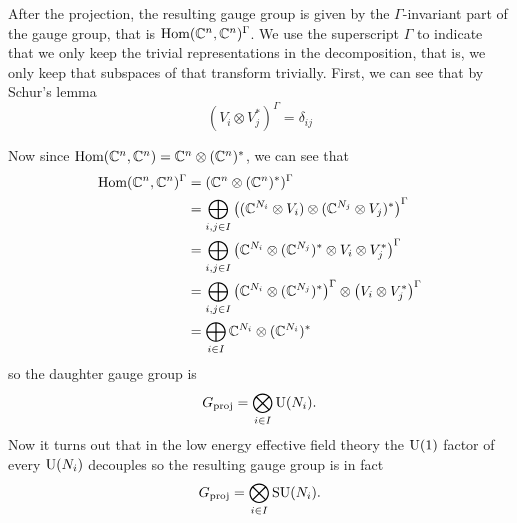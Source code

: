 \documentclass[a4paper,11pt]{article}
\begin{document}
        After the projection, the resulting gauge group is given by the $\Gamma$-invariant part of the gauge group, that is $\text{Hom}(\mathbb{C}^n,\mathbb{C}^n)^\Gamma$. We use the superscript $\Gamma$ to indicate that we only keep the trivial representations in the decomposition, that is, we only keep that subspaces of that transform trivially. First, we can see that by Schur's lemma \marker
        \begin{equation}
            (V_i\otimes V^*_j)^\Gamma=\delta_{ij}
        \end{equation}
        
        Now since $\text{Hom}(\mathbb{C}^n,\mathbb{C}^n)=\mathbb{C}^n\otimes(\mathbb{C}^n)^*$, we can see that
        \begin{align}
            \text{Hom}(\mathbb{C}^n,\mathbb{C}^n)^\Gamma &= (\mathbb{C}^n\otimes(\mathbb{C}^n)^*)^\Gamma\\
            &= \bigoplus_{i,j\in I} \left((\mathbb{C}^{N_i}\otimes V_i)\otimes(\mathbb{C}^{N_j}\otimes V_j)^*\right)^\Gamma\\
            &= \bigoplus_{i,j\in I} \left(\mathbb{C}^{N_i}\otimes(\mathbb{C}^{N_j})^*\otimes V_i\otimes V^*_j\right)^\Gamma\\
            &= \bigoplus_{i,j\in I} \left(\mathbb{C}^{N_i}\otimes(\mathbb{C}^{N_j})^*\right)^\Gamma\otimes\left(V_i\otimes V^*_j\right)^\Gamma\\
            &= \bigoplus_{i\in I}\mathbb{C}^{N_i}\otimes(\mathbb{C}^{N_i})^*
        \end{align}
        so the daughter gauge group is
        \begin{equation}
            G_{\text{proj}} = \bigotimes_{i\in I}\text{U}(N_i).
        \end{equation}
        Now it turns out that in the low energy effective field theory the $\text{U}(1)$ factor of every $\text{U}(N_i)$ decouples \marker so the resulting gauge group is in fact
        \begin{equation}
            G_{\text{proj}} = \bigotimes_{i\in I}\text{SU}(N_i).
        \end{equation}
\end{document}
